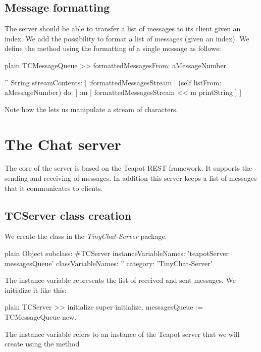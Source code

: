 \documentclass[10pt,twoside,english]{_support/latex/sbabook/sbabook}
\begin{document}
\subsection{Message formatting}
The server should be able to transfer a list of messages to its client given an index.
We add the possibility to format a list of messages (given an index).
We define the method  using the formatting of a single message as follows:

\begin{displaycode}{plain}
TCMessageQueue >> formattedMessagesFrom: aMessageNumber
	
	^ String streamContents: [ :formattedMessagesStream |  
		(self listFrom: aMessageNumber) 
			do: [ :m | formattedMessagesStream << m printString ] 
		]
\end{displaycode}

Note how the  lets us manipulate a stream of characters. 
\section{The Chat server}
The core of the server is based on the Teapot REST framework. It supports the sending and receiving of messages.
In addition this server keeps a list of messages that it communicates to clients. 
\subsection{TCServer class creation}
We create the class  in the \textit{TinyChat-Server} package. 

\begin{displaycode}{plain}
Object subclass: #TCServer
	instanceVariableNames: 'teapotServer messagesQueue'
	classVariableNames: ''
	category: 'TinyChat-Server'
\end{displaycode}

The instance variable  represents the list of received and sent messages.
We initialize it like this:

\begin{displaycode}{plain}
TCServer >> initialize
	super initialize.
	messagesQueue := TCMessageQueue new.
\end{displaycode}

The instance variable  refers to an instance of the Teapot server that we will create using the method 
\end{document}
